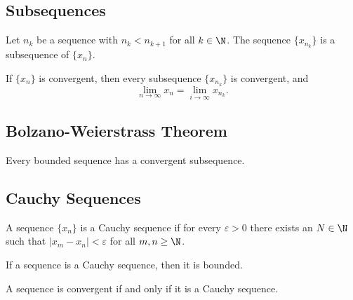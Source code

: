 \documentclass[12pt]{article}
\begin{document}
\subsection{Subsequences}
\begin{definition}
    Let \(n_k\) be a sequence with \(n_k<n_{k+1}\) for all \(k\in\N\).
    The sequence \(\{x_{n_k}\}\) is a subsequence of \(\{x_n\}\).
\end{definition}
\begin{theorem}
    If \(\{x_n\}\) is convergent, then every subsequence \(\{x_{n_k}\}\) is
    convergent, and
    \[\lim_{n\to\infty}x_n=\lim_{i\to\infty}x_{n_k}.\]
\end{theorem}

\subsection{Bolzano-Weierstrass Theorem}
\begin{theorem}
    Every bounded sequence has a convergent subsequence.
\end{theorem}

\subsection{Cauchy Sequences}
\begin{definition}
    A sequence \(\{x_n\}\) is a Cauchy sequence if for every
    \(\varepsilon>0\) there exists an \(N\in\N\) such that
    \(|x_m-x_n|<\varepsilon\) for all \(m,n\geq\N\).
\end{definition}
\begin{theorem}
    If a sequence is a Cauchy sequence, then it is bounded.
\end{theorem}
\begin{theorem}
    A sequence is convergent if and only if it is a Cauchy sequence.
\end{theorem}
\end{document}
